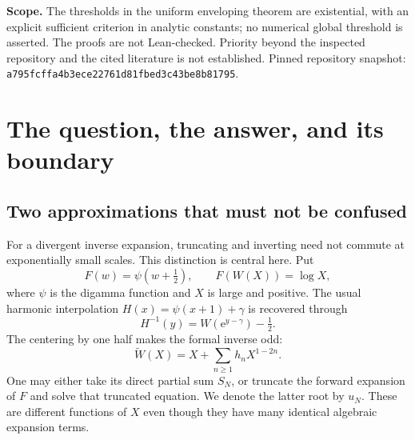 \documentclass[11pt,a4paper]{article}
\theoremstyle{definition}
\numberwithin{equation}{section}
\newcommand{\ee}{\mathrm{e}}
\newcommand{\Oh}{\mathcal O}
\newcommand{\Wformal}{\widetilde W}
\begin{document}
\begin{titlepage}
\begin{abstract}
For $\sigma=N+1-\pi X$ bounded, the sharp error is
\[
 S_N-W=(-1)^N\sqrt X\,\ee^{-2\pi X}
 \left\{1+\frac1X\left[-\frac\pi{12}
 +\frac{2\sigma^2-3\sigma+7/12}{2\pi}\right]
 +\Oh(X^{-2})\right\}.
\]
We prove an all-orders extension, give the next explicit coefficient,
identify the half-next-term law and a square-root truncation window,
and quantify the first difference from forward-truncation inversion.
Exact rational sign certificates and 190-digit experiments accompany the proofs.
\end{abstract}
\vspace{3mm}
\noindent\textbf{Scope.} The thresholds in the uniform enveloping theorem are
existential, with an explicit sufficient criterion in analytic constants;
no numerical global threshold is asserted. The proofs are not Lean-checked.
Priority beyond the inspected repository and the cited literature is not established.
\vfill
\noindent\small Pinned repository snapshot:
\texttt{a795fcffa4b3ece22761d81fbed3c43be8b81795}.
\end{titlepage}
\hypersetup{pageanchor=true}
\begingroup\small\setlength{\parskip}{0pt}\tableofcontents\endgroup
\newpage

\section{The question, the answer, and its boundary}
\label{sec:introduction}

\subsection{Two approximations that must not be confused}
For a divergent inverse expansion, truncating and inverting need not commute
at exponentially small scales. This distinction is central here. Put
\begin{equation}
 F(w)=\psi(w+\tfrac12),\qquad F(W(X))=\log X,
 \label{eq:normalization}
\end{equation}
where $\psi$ is the digamma function and $X$ is large and positive.
The usual harmonic interpolation $H(x)=\psi(x+1)+\gamma$ is recovered through
\begin{equation}
 H^{-1}(y)=W(\ee^{y-\gamma})-\tfrac12.
 \label{eq:harmonic}
\end{equation}
The centering by one half makes the formal inverse odd:
\begin{equation}
 \Wformal(X)=X+\sum_{n\ge1}h_nX^{1-2n}.
 \label{eq:formalW}
\end{equation}
One may either take its direct partial sum $S_N$, or truncate the forward
expansion of $F$ and solve that truncated equation. We denote the latter
root by $u_N$. These are different functions of $X$ even though they have
many identical algebraic expansion terms.
\end{document}
